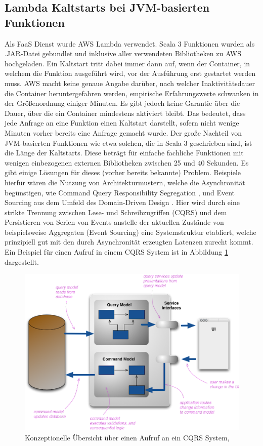 \subsection{Lambda Kaltstarts bei JVM-basierten Funktionen}
Als FaaS Dienst wurde AWS Lambda verwendet. Scala 3 Funktionen wurden als .JAR-Datei gebundlet und inklusive aller verwendeten Bibliotheken zu AWS hochgeladen. Ein Kaltstart tritt dabei immer dann auf, wenn der Container, in welchem die Funktion ausgeführt wird, vor der Ausführung erst gestartet werden muss. AWS macht keine genaue Angabe darüber, nach welcher Inaktivitätsdauer die Container heruntergefahren werden, empirische Erfahrungswerte schwanken in der Größenordnung einiger Minuten. Es gibt jedoch keine Garantie über die Dauer, über die ein Container mindestens aktiviert bleibt. Das bedeutet, dass jede Anfrage an eine Funktion einen Kaltstart darstellt, sofern nicht wenige Minuten vorher bereits eine Anfrage gemacht wurde. Der große Nachteil von JVM-basierten Funktionen wie etwa solchen, die in Scala 3 geschrieben sind, ist die Länge der Kaltstarts. Diese beträgt für einfache fachliche Funktionen mit wenigen einbezogenen externen Bibliotheken zwischen 25 und 40 Sekunden. Es gibt einige Lösungen für dieses (vorher bereits bekannte) Problem. Beispiele hierfür wären die Nutzung von Architekturmustern, welche die Asynchronität begünstigen, wie Command Query Responsibility Segregation \cite[vgl.][]{Fowler2011}, und Event Sourcing \cite[vgl.][]{Fowler2005} aus dem Umfeld des Domain-Driven Design \cite[vgl.][]{Evans2004}. Hier wird durch eine strikte Trennung zwischen Lese- und Schreibzugriffen (CQRS) und dem Persistieren von Serien von Events anstelle der aktuellen Zustände von beispielsweise Aggregaten (Event Sourcing) eine Systemstruktur etabliert, welche prinzipiell gut mit den durch Asynchronität erzeugten Latenzen zurecht kommt. Ein Beispiel für einen Aufruf in einem CQRS System ist in Abbildung \ref{fig:cqrs} dargestellt.
\begin{figure}[H]
    \centering
    \includegraphics[width = .9\textwidth]{images/cqrs.png}
    \caption{Konzeptionelle Übersicht über einen Aufruf an ein CQRS System, \cite{Fowler2011}}
    \label{fig:cqrs}
\end{figure}
